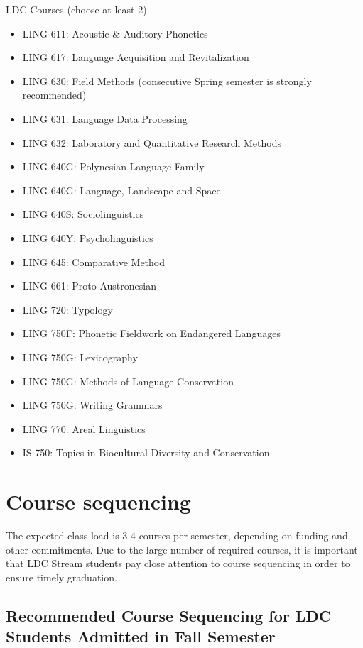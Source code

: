 \documentclass[
]{book}
\providecommand{\tightlist}{%
  \setlength{\itemsep}{0pt}\setlength{\parskip}{0pt}}
\begin{document}
LDC Courses (choose at least 2)

\begin{itemize}
\tightlist
\item
  LING 611: Acoustic \& Auditory Phonetics
\item
  LING 617: Language Acquisition and Revitalization
\item
  LING 630: Field Methods (consecutive Spring semester is strongly recommended)
\item
  LING 631: Language Data Processing
\item
  LING 632: Laboratory and Quantitative Research Methods
\item
  LING 640G: Polynesian Language Family
\item
  LING 640G: Language, Landscape and Space
\item
  LING 640S: Sociolinguistics
\item
  LING 640Y: Psycholinguistics
\item
  LING 645: Comparative Method
\item
  LING 661: Proto-Austronesian
\item
  LING 720: Typology
\item
  LING 750F: Phonetic Fieldwork on Endangered Languages
\item
  LING 750G: Lexicography
\item
  LING 750G: Methods of Language Conservation
\item
  LING 750G: Writing Grammars
\item
  LING 770: Areal Linguistics
\item
  IS 750: Topics in Biocultural Diversity and Conservation
\end{itemize}

\section{Course sequencing}\label{course-sequencing}

The expected class load is 3-4 courses per semester, depending on funding and other commitments.
Due to the large number of required courses, it is important that LDC Stream students pay close attention to course sequencing in order to ensure timely graduation.

\subsection{Recommended Course Sequencing for LDC Students Admitted in Fall Semester}\label{recommended-course-sequencing-for-ldc-students-admitted-in-fall-semester}
\end{document}
